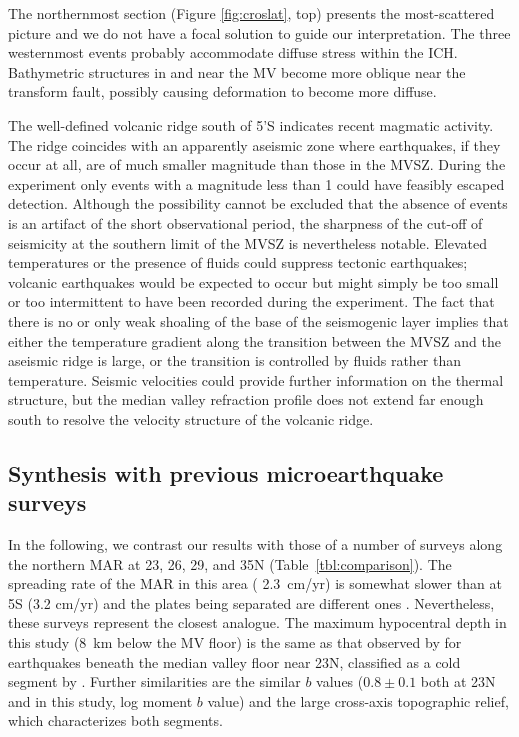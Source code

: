\documentclass[aguplus]{aguplus}
\newlength{\tw}
\begin{document}
\begin{article}
The northernmost section (Figure \ref{fig:croslat}, top) presents the
most-scattered picture and we do not have a focal solution to guide
our interpretation.  The three westernmost events probably
accommodate diffuse stress within the ICH.   Bathymetric structures
in and near the MV become
more oblique near the transform fault, possibly causing
deformation to become more diffuse.

The well-defined volcanic ridge south of 5'S \citep{reston02} indicates recent magmatic
activity.  The ridge coincides with an apparently aseismic zone where
earthquakes, if they occur at all, are of much smaller magnitude
than
those in the MVSZ. During the experiment only events with a magnitude
less than 1 could have feasibly escaped detection. Although
the possibility cannot be excluded that the absence of events is an
artifact of the short observational period, the sharpness of the
cut-off of seismicity at the southern limit of the MVSZ is
nevertheless notable.  Elevated temperatures or the presence of fluids
could suppress tectonic earthquakes;  volcanic earthquakes would be
expected to occur but might simply be too small or too intermittent to
have been recorded during the experiment.  The fact that there is no
or only weak shoaling of the base of the seismogenic layer implies
that either the temperature gradient along the transition between the MVSZ
and the aseismic ridge is large, or the transition is controlled by
fluids rather than temperature.   Seismic velocities could provide
further information on the thermal structure, but the median valley
refraction profile does not extend far enough south to resolve the
velocity structure of the volcanic ridge.

\subsection{Synthesis with previous microearthquake surveys}



In the following, we contrast our results with those of a number of
surveys along the northern MAR at 23\dg, 26\dg, 29\dg,  and 35\dg N (Table~\ref{tbl:comparison}).  The spreading
rate of the MAR in this area ( 2.3~cm/yr) is somewhat slower than
at 5\dg S (3.2 cm/yr) and the plates being separated are different
ones \citep{demets94}.
Nevertheless, these surveys represent the closest analogue.
The maximum hypocentral depth in this study (8~km below the MV
floor) is the same as that
observed by \citet{toomey88} for earthquakes beneath the median valley
floor near 23\dg N, classified as a cold segment by \citet{thibaud98}. Further similarities are the
similar $b$ values ($0.8\pm0.1$ both at 23\dg N and in this
study, log moment $b$ value) and the large cross-axis topographic relief, which
characterizes both segments.


\end{article}
\end{document}
